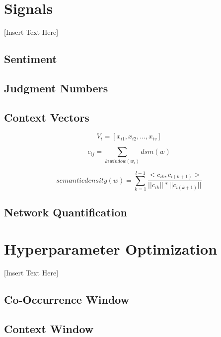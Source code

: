 \documentclass[11pt]{article}
\begin{document}
\section{Signals}
\label{signals}

[Insert Text Here]

\subsection{Sentiment}
\label{sect:sentiment}


\subsection{Judgment Numbers}
\label{sect:judgments}


\subsection{Context Vectors}
\label{sect:cv}

\begin{equation}
V_{i}=[x_{i1},x_{i2},...,x_{iv}]
\end{equation}

\begin{equation}
c_{ij}=\sum_{k \epsilon window(w_{i})} dsm(w)
\end{equation}

\begin{equation}
semantic density(w) = \sum_{k=1}^{l-1} \frac{<c_{ik},c_{i(k+1)}>}{||c_{ik}||*||c_{i(k+1)}||}
\end{equation}


\subsection{Network Quantification}
\label{sect:network}

\section{Hyperparameter Optimization}
\label{hyper}

[Insert Text Here]

\subsection{Co-Occurrence Window}
\label{cooc window}


\subsection{Context Window}
\label{sect:context window}
\end{document}
